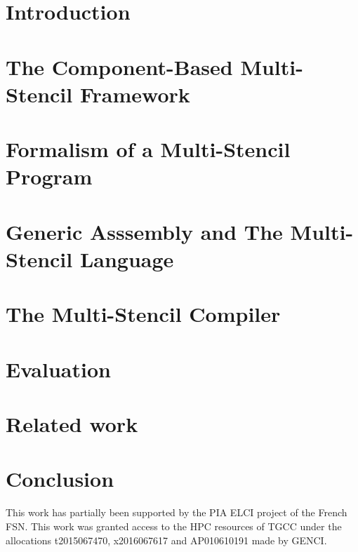 \documentclass[smallextended]{svjour3}       %
\begin{document}
\section{Introduction}
\label{sect:introduction}

\section{The Component-Based Multi-Stencil Framework}
\label{sect:msf}

\section{Formalism of a Multi-Stencil Program}
\label{sect:formalism}

\section{Generic Asssembly and The Multi-Stencil Language}
\label{sect:msl}

\section{The Multi-Stencil Compiler}
\label{sect:parallelism}

\section{Evaluation}
\label{sect:eval}

\section{Related work}
\label{sect:rel}

\section{Conclusion}
\label{sect:concl}

\begin{acknowledgements}
This work has partially been supported by the PIA ELCI project of the French FSN.
This  work  was  granted  access  to  the  HPC  resources  of TGCC under  the 
allocations t2015067470, x2016067617 and AP010610191 made by GENCI.
\end{acknowledgements}


\end{document}
